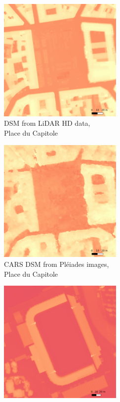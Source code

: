 \begin{figure}
    \centering
    \begin{subfigure}[t]{0.5\linewidth}
        \centering
        \includegraphics[height=6cm]{Images/Chap_1/DSM_Capitole_LiDAR.png}
        \caption{DSM from LiDAR HD data,\\Place du Capitole}
        \label{fig:DSM_capitole_lidar}
    \end{subfigure}\hfill
    \begin{subfigure}[t]{0.5\linewidth}
        \centering
        \includegraphics[height=6cm]{Images/Chap_1/DSM_Capitole_CARS.png}
        \caption{CARS DSM from Pléiades images,\\Place du Capitole}
        \label{fig:DSM_capitole_cars}
    \end{subfigure}
    \begin{subfigure}[t]{0.5\linewidth}
        \centering
        \includegraphics[height=6cm]{Images/Chap_1/DSM_Wallon_LiDAR.png}

\end{subfigure}
\end{figure}
